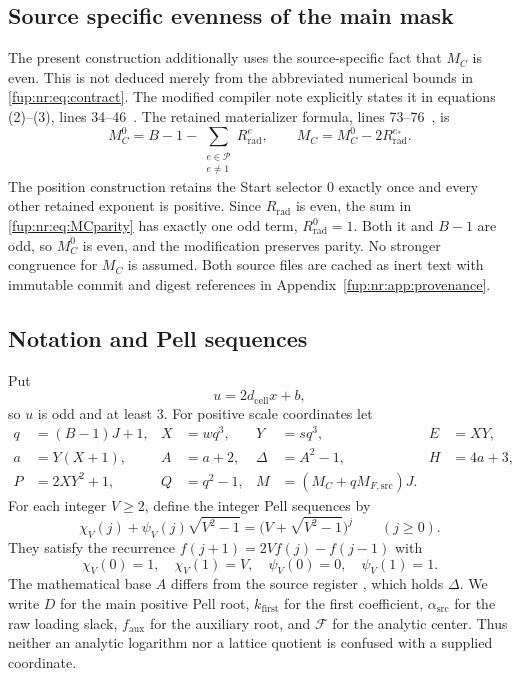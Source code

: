 \documentclass[11pt,letterpaper]{article}
\theoremstyle{definition}\newtheorem{definition}[theorem]{Definition}
\theoremstyle{remark}\newtheorem{remark}[theorem]{Remark}
\newcommand{\code}[1]{\texttt{\detokenize{#1}}}
\newcommand{\MC}{M_C}
\newcommand{\dcell}{d_{\mathrm{cell}}}
\newcommand{\MFsrcV}{M_{F,\mathrm{src}}}
\newcommand{\faux}{f_{\mathrm{aux}}}\newcommand{\rmain}{r_{\mathrm{main}}}\newcommand{\acent}{\mathcal F}
\begin{document}
\subsection{Source specific evenness of the main mask}\label{fup:nr:sec:parity}
The present construction additionally uses the source-specific fact that $\MC$ is even. This is not deduced merely from the abbreviated numerical bounds in \eqref{fup:nr:eq:contract}. The modified compiler note explicitly states it in equations (2)--(3), lines 34--46~\cite{fup:nr:compiler}. The retained materializer formula, lines 73--76~\cite{fup:nr:materializer}, is
\begin{equation}\label{fup:nr:eq:MCparity}
 \MC^0=B-1-\sum_{\substack{e\in\mathcal P\\e\ne1}}R_{\mathrm{rad}}^e,
 \qquad \MC=\MC^0-2R_{\mathrm{rad}}^{e_*}.
\end{equation}
The position construction retains the Start selector $0$ exactly once and every other retained exponent is positive. Since $R_{\mathrm{rad}}$ is even, the sum in \eqref{fup:nr:eq:MCparity} has exactly one odd term, $R_{\mathrm{rad}}^0=1$. Both it and $B-1$ are odd, so $\MC^0$ is even, and the modification preserves parity. No stronger congruence for $\MC$ is assumed. Both source files are cached as inert text with immutable commit and digest references in Appendix~\ref{fup:nr:app:provenance}.

\subsection{Notation and Pell sequences}
Put
\begin{equation}\label{fup:nr:eq:u}
 u=2\dcell x+b,
\end{equation}
so $u$ is odd and at least $3$. For positive scale coordinates let
\begin{align}\label{fup:nr:eq:scales}
 q&=(B-1)J+1,&X&=wq^3,&Y&=sq^3,&E&=XY,\\
 a&=Y(X+1),&A&=a+2,&\Delta&=A^2-1,&H&=4a+3,\nonumber\\
 P&=2XY^2+1,&Q&=q^2-1,&M&=(\MC+q\MFsrcV)J.&&\nonumber
\end{align}
For each integer $V\ge2$, define the integer Pell sequences by
\begin{equation}\label{fup:nr:eq:pell}
 \chi_V(j)+\psi_V(j)\sqrt{V^2-1}
 =\bigl(V+\sqrt{V^2-1}\bigr)^j\qquad(j\ge0).
\end{equation}
They satisfy the recurrence $f(j+1)=2Vf(j)-f(j-1)$ with
\[
 \chi_V(0)=1,\quad\chi_V(1)=V,\quad
 \psi_V(0)=0,\quad\psi_V(1)=1.
\]
The mathematical base $A$ differs from the source register \code{A}, which holds $\Delta$. We write $D$ for the main positive Pell root, $k_{\mathrm{first}}$ for the first coefficient, $\alpha_{\mathrm{src}}$ for the raw loading slack, $\faux$ for the auxiliary root, and $\acent$ for the analytic center. Thus neither an analytic logarithm nor a lattice quotient is confused with a supplied coordinate.
\end{document}
